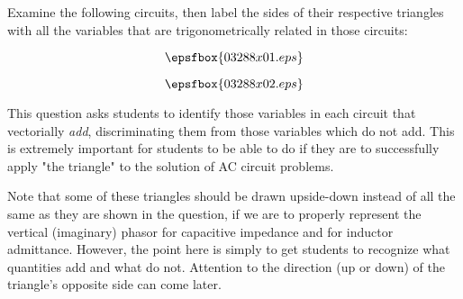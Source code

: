

Examine the following circuits, then label the sides of their respective triangles with all the variables that are trigonometrically related in those circuits:

$$\epsfbox{03288x01.eps}$$







$$\epsfbox{03288x02.eps}$$







This question asks students to identify those variables in each circuit that vectorially {\it add}, discriminating them from those variables which do not add.  This is extremely important for students to be able to do if they are to successfully apply "the triangle" to the solution of AC circuit problems.

Note that some of these triangles should be drawn upside-down instead of all the same as they are shown in the question, if we are to properly represent the vertical (imaginary) phasor for capacitive impedance and for inductor admittance.  However, the point here is simply to get students to recognize what quantities add and what do not.  Attention to the direction (up or down) of the triangle's opposite side can come later.




